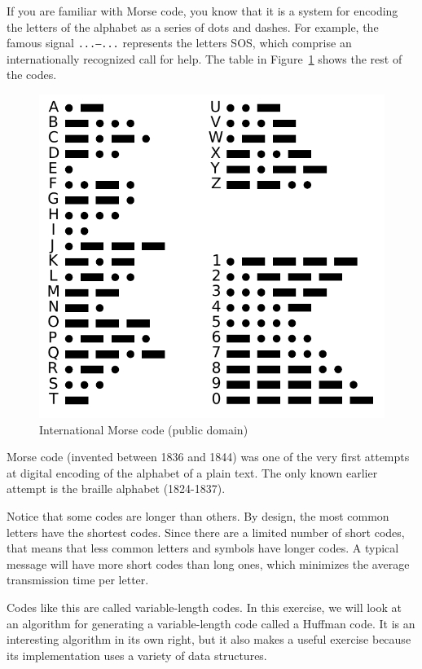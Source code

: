 If you are familiar with Morse code, you know that it is a 
system for encoding the letters of the alphabet as a series 
of dots and dashes. For example, the famous signal {\tt ...---...} 
represents the letters SOS, which comprise an 
internationally recognized call for help. The table 
in Figure~\ref{fig.morse} shows the rest of the codes.

\begin{figure}
\centerline
{\includegraphics[scale=0.6]{figs/International_Morse_Code.pdf}}
\caption{International Morse code (public domain)}
\label{fig.morse}
\end{figure}

Morse code (invented between 1836 and 1844) was one of the 
very first attempts at digital encoding of the alphabet of a 
plain text. The only known earlier attempt is the braille 
alphabet (1824-1837).

Notice that some codes are longer than others. By design, the 
most common letters have the shortest codes. Since there are a 
limited number of short codes, that means that less common letters 
and symbols have longer codes. A typical message will have more 
short codes than long ones, which minimizes the average 
transmission time per letter.

Codes like this are called variable-length codes. In this exercise, 
we will look at an algorithm for generating a variable-length code 
called a Huffman code. It is an interesting algorithm in its own 
right, but it also makes a useful exercise because its implementation 
uses a variety of data structures.

